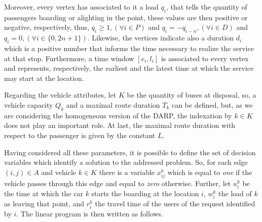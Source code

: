 \documentclass[tuberlin,cic,tc,openright,english,noabntcite,oneside]{iiufrgs}
\begin{document}
Moreover, every vertex has associated to it a load $q_{i}$, that tells the quantity of passengers boarding or alighting in the point, these values are then positive or negative, respectively, thus, $q_{i}\geq 1, (\forall i \in P)$ and $q_{i} = -q_{i-n}, (\forall i \in D)$ and $q_{i} = 0, (\forall i \in \{0,2n+1\})$. Likewise, the vertices indicate also a duration $d_i$ which is a positive number that informs the time necessary to realize the service at that stop. Furthermore, a time window $[e_{i}, l_{i}]$ is associated to every vertex and represents, respectively, the earliest and the latest time at which the service may start at the location.

Regarding the vehicle attributes, let $K$ be the quantity of buses at disposal, so, a vehicle capacity $Q_{k}$ and a maximal route duration $T_{k}$ can be defined, but, as we are considering the homogeneous version of the DARP, the indexation by $k \in K$ does not play an important role. At last, the maximal route duration with respect to the passenger is given by the constant $L$.

Having considered all these parameters, it is possible to define the set of decision variables which identify a solution to the addressed problem. So, for each edge $(i,j) \in A$ and vehicle $k \in K$ there is a variable $x_{ij}^k$ which is equal to \emph{one} if the vehicle passes through this edge and equal to \emph{zero} otherwise. Further, let $u_i^k$ be the time at which the car $k$ starts the boarding at the location $i$, $w_i^k$ the load of $k$ as leaving that point, and $r_i^k$ the travel time of the users of the request identified by $i$. The linear program is then written as follows.
\end{document}
